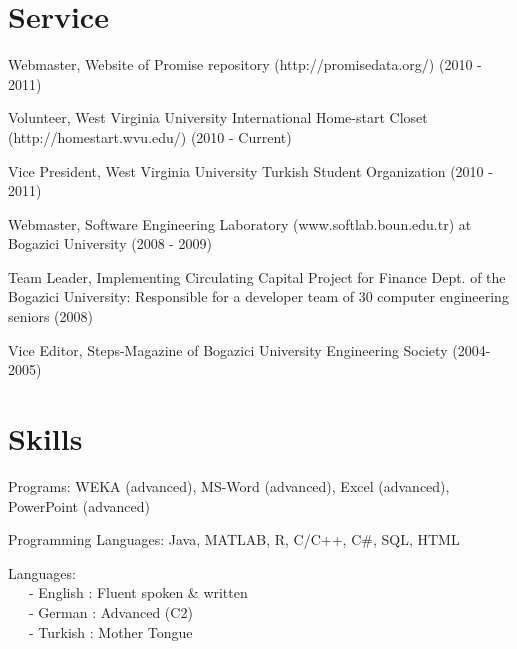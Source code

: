 \documentclass[margin]{res}
\begin{document}
\begin{resume}
\section{Service}


\begin{list}{}{\leftmargin=0.5em}
\item Webmaster, Website of Promise repository (http://promisedata.org/) (2010 - 2011)
\item Volunteer, West Virginia University International Home-start Closet (http://homestart.wvu.edu/) (2010 - Current)
\item Vice President, West Virginia University Turkish Student Organization (2010 - 2011)
\item Webmaster, Software Engineering Laboratory (www.softlab.boun.edu.tr) at Bogazici University (2008 - 2009)
\item Team Leader, Implementing Circulating Capital Project for Finance Dept. of the Bogazici University: Responsible for a developer team of 30 computer engineering seniors (2008) 
\item Vice Editor, Steps-Magazine of Bogazici University Engineering Society (2004-2005)
\end{list}

\section{Skills}

\begin{list}{}{\leftmargin=0.5em}
\item Programs:  WEKA (advanced), MS-Word (advanced), Excel (advanced), PowerPoint (advanced) 
\item Programming  Languages: Java, MATLAB, R, C/C++, C\#, SQL, HTML
\item Languages: \\
	~~~- English	: Fluent spoken \& written \\
	~~~- German	: Advanced (C2) \\
	~~~- Turkish	: Mother Tongue \\
\end{list}




\end{resume} 
\end{document}
